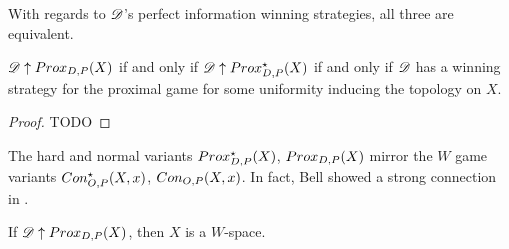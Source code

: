 With regards to $\mathscr{D}$'s perfect information winning strategies, all three
are equivalent.

\begin{thm}
  $\mathscr{D}\uparrow Prox_{D,P}(X)$ if and only if $\mathscr{D}\uparrow Prox^\star_{D,P}(X)$ if and
  only if $\mathscr{D}$ has a winning strategy for the proximal game for some
  uniformity inducing the topology on $X$.
\end{thm}

\begin{proof}
  TODO
\end{proof}

The hard and normal variants $Prox^\star_{D,P}(X)$, $Prox_{D,P}(X)$ mirror the
$W$ game variants $Con_{O,P}^\star(X,x)$, $Con_{O,P}(X,x)$. In fact, Bell
showed a strong connection in \cite{MR3239205}.

\begin{thm}
  If $\mathscr{D}\uparrow Prox_{D,P}(X)$, then $X$ is a $W$-space.
\end{thm}



